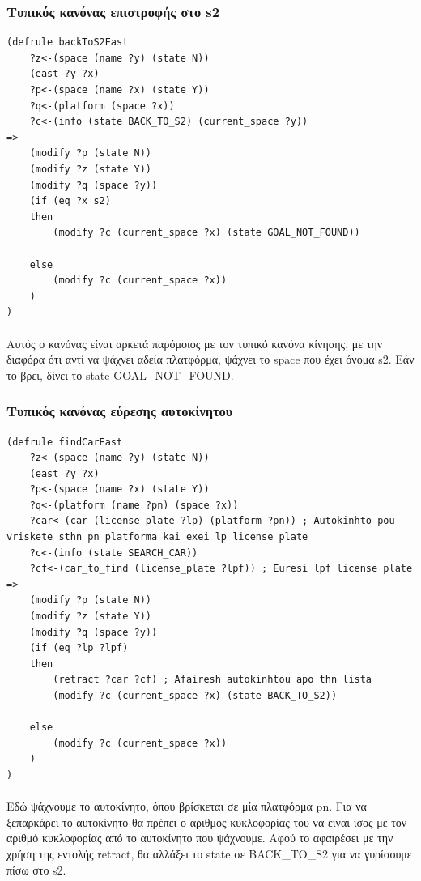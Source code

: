 \documentclass{article}
\begin{document}
    \subsubsection{Τυπικός κανόνας επιστροφής στο s2}
    \begin{lstlisting}[caption=Τυπικός κανόνας επιστροφής στο s2]
(defrule backToS2East
    ?z<-(space (name ?y) (state N))
    (east ?y ?x)
    ?p<-(space (name ?x) (state Y))
    ?q<-(platform (space ?x))
    ?c<-(info (state BACK_TO_S2) (current_space ?y))
=>
    (modify ?p (state N))
    (modify ?z (state Y))
    (modify ?q (space ?y))
    (if (eq ?x s2)
    then
        (modify ?c (current_space ?x) (state GOAL_NOT_FOUND))

    else
        (modify ?c (current_space ?x))
    )
)
    \end{lstlisting}

    \paragraph{}
    Αυτός ο κανόνας είναι αρκετά παρόμοιος με τον τυπικό κανόνα κίνησης, με την διαφόρα ότι αντί να ψάχνει αδεία πλατφόρμα, ψάχνει το space που έχει
    όνομα s2. Εάν το βρει, δίνει το state GOAL\_NOT\_FOUND.

    \newpage
    \subsubsection{Τυπικός κανόνας εύρεσης αυτοκίνητου}
    \begin{lstlisting}[caption=Τυπικός κανόνας εύρεσης αυτοκίνητου]
(defrule findCarEast
    ?z<-(space (name ?y) (state N))
    (east ?y ?x)
    ?p<-(space (name ?x) (state Y))
    ?q<-(platform (name ?pn) (space ?x))
    ?car<-(car (license_plate ?lp) (platform ?pn)) ; Autokinhto pou vriskete sthn pn platforma kai exei lp license plate
    ?c<-(info (state SEARCH_CAR))
    ?cf<-(car_to_find (license_plate ?lpf)) ; Euresi lpf license plate
=>
    (modify ?p (state N))
    (modify ?z (state Y))
    (modify ?q (space ?y))
    (if (eq ?lp ?lpf)
    then
        (retract ?car ?cf) ; Afairesh autokinhtou apo thn lista
        (modify ?c (current_space ?x) (state BACK_TO_S2))
    
    else
        (modify ?c (current_space ?x))
    )
)
    \end{lstlisting}

    \paragraph{}
    Εδώ ψάχνουμε το αυτοκίνητο, όπου βρίσκεται σε μία πλατφόρμα pn. Για να ξεπαρκάρει το αυτοκίνητο θα πρέπει ο αριθμός κυκλοφορίας του
    να είναι ίσος με τον αριθμό κυκλοφορίας από το αυτοκίνητο που ψάχνουμε. Αφού το αφαιρέσει με την χρήση της εντολής retract, θα αλλάξει το
    state σε BACK\_TO\_S2 για να γυρίσουμε πίσω στο s2.
\end{document}

